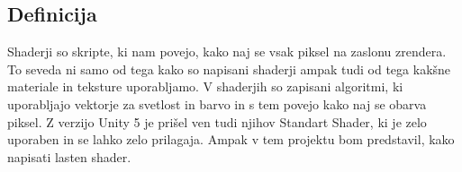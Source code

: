 {\color{indiagreen}\subsection{Definicija}}
Shaderji so skripte, ki nam povejo, kako naj se vsak piksel na zaslonu zrendera. To seveda ni samo od tega kako so napisani shaderji ampak tudi od tega kakšne materiale in teksture uporabljamo. V shaderjih so zapisani algoritmi, ki uporabljajo vektorje za svetlost in barvo in s tem povejo kako naj se obarva piksel. Z verzijo Unity 5 je prišel ven tudi njihov Standart Shader, ki je zelo uporaben in se lahko zelo prilagaja. Ampak v tem projektu bom predstavil, kako napisati lasten shader. 